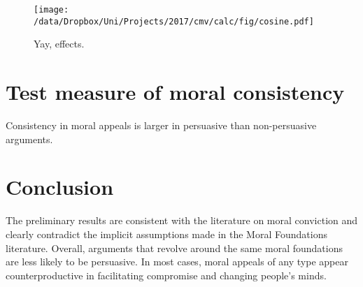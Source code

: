\begin{figure}
\centering
\texttt{[image: /data/Dropbox/Uni/Projects/2017/cmv/calc/fig/cosine.pdf]}
\caption{Yay, effects.}
\end{figure}





\section{Test measure of moral consistency}\label{test-measure-of-moral-consistency}


Consistency in moral appeals is larger in persuasive than non-persuasive arguments.

\section{Conclusion}\label{conclusion}

The preliminary results are consistent with the literature on moral conviction and clearly contradict the implicit assumptions made in the Moral Foundations literature. Overall, arguments that revolve around the same moral foundations are less likely to be persuasive. In most cases, moral appeals of any type appear counterproductive in facilitating compromise and changing people's minds.



